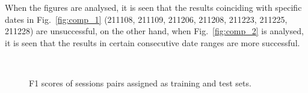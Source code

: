 \documentclass[journal]{IEEEtran}
\begin{document}
When the figures are analysed, it is seen that the results coinciding with specific dates in Fig.~\ref{fig:comp_1} (211108, 211109, 211206, 211208, 211223, 211225, 211228) are unsuccessful, on the other hand, when Fig.~\ref{fig:comp_2} is analysed, it is seen that the results in certain consecutive date ranges are more successful.




\begin{figure}[ht]
	
	\\
	
	
	\caption{F1 scores of sessions pairs  assigned as training and test sets.}
	\label{fig:stepsofID}
\end{figure}
\end{document}
